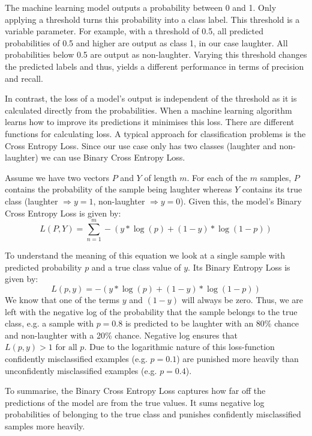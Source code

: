 \documentclass[bsc,frontabs,parskip,deptreport]{infthesis}
\begin{document}
The machine learning model outputs a probability between 0 and 1. Only applying a threshold turns this probability into a class label. This threshold is a variable parameter.
For example, with a threshold of 0.5, all predicted probabilities of 0.5 and higher are output as class 1, in our case laughter. All probabilities below 0.5 are output as non-laughter. 
Varying this threshold changes the predicted labels and thus, yields a different performance in terms of precision and recall. 

In contrast, the loss of a model's output is independent of the threshold as it is calculated directly from the probabilities.
When a machine learning algorithm learns how to improve its predictions it minimises this loss. There are different functions for calculating loss.
A typical approach for classification problems is the Cross Entropy Loss. Since our use case only has two classes (laughter and non-laughter) we can use Binary Cross Entropy Loss. 

Assume we have two vectors $P$ and $Y$ of length $m$. For each of the $m$ samples, $P$ contains the probability of the sample being laughter whereas $Y$ contains its true class (laughter $\Rightarrow y=1$, non-laughter $ \Rightarrow y=0$).
Given this, the model's Binary Cross Entropy Loss is given by:
$$ L(P,Y) = \sum_{n=1}^{m}  -{(y*\log(p) + (1 - y)*\log(1 - p))}$$

To understand the meaning of this equation we look at a single sample with predicted probability $p$ and a true class value of $y$. Its Binary Entropy Loss is given by: 
$$ L(p,y) = -{(y*\log(p) + (1 - y)*\log(1 - p))} $$
We know that one of the terms $y$ and $(1-y)$ will always be zero.
Thus, we are left with the negative log of the probability that the sample belongs to the true class, e.g. a sample with $p=0.8$ is predicted to be laughter with an 80\% chance and non-laughter with a 20\% chance. Negative log ensures that $L(p,y) > 1  \textrm{ for all } p $. 
Due to the logarithmic nature of this loss-function confidently misclassified examples (e.g. $p=0.1$) are punished more heavily than unconfidently misclassified examples (e.g. $p=0.4$).

To summarise, the Binary Cross Entropy Loss captures how far off the predictions of the model are from the true values. It sums negative log probabilities of belonging to the true class and punishes confidently misclassified samples more heavily.
\end{document}
